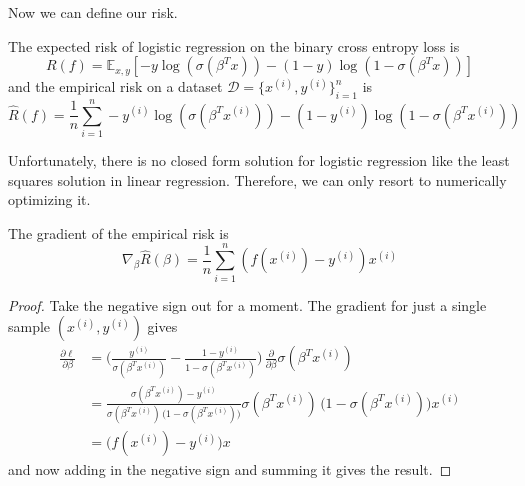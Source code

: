   Now we can define our risk. 

  \begin{theorem}[Risk]
    The expected risk of logistic regression on the binary cross entropy loss is 
    \begin{equation}
      R(f) = \mathbb{E}_{x, y} \left[ -y \log(\sigma(\beta^T x)) - (1 - y) \log(1 - \sigma(\beta^T x)) \right]
    \end{equation} 
    and the empirical risk on a dataset $\mathcal{D} = \{x^{(i)}, y^{(i)}\}_{i=1}^n$ is 
    \begin{equation}
      \hat{R}(f) = \frac{1}{n} \sum_{i=1}^n -y^{(i)} \log(\sigma(\beta^T x^{(i)})) - (1 - y^{(i)}) \log(1 - \sigma(\beta^T x^{(i)}))
    \end{equation}
  \end{theorem}

  Unfortunately, there is no closed form solution for logistic regression like the least squares solution in linear regression. Therefore, we can only resort to numerically optimizing it. 

  \begin{theorem}
    The gradient of the empirical risk is 
    \begin{equation}
      \nabla_\beta \hat{R}(\beta) = \frac{1}{n} \sum_{i=1}^n \left( f(x^{(i)}) - y^{(i)} \right) x^{(i)}
    \end{equation}
  \end{theorem}
  \begin{proof}
    Take the negative sign out for a moment. The gradient for just a single sample $(x^{(i)}, y^{(i)})$ gives 
    \begin{align}
      \frac{\partial \ell}{\partial \beta}  & = \bigg( \frac{y^{(i)}}{\sigma(\beta^T x^{(i)})} - \frac{1 - y^{(i)}}{1 - \sigma(\beta^T x^{(i)})} \bigg) \, \frac{\partial}{\partial \beta} \sigma (\beta^T x^{(i)}) \\
      & = \frac{\sigma(\beta^T x^{(i)}) - y^{(i)}}{\sigma(\beta^T x^{(i)}) \, \big( 1 - \sigma(\beta^T x^{(i)}) \big)} \sigma(\beta^T x^{(i)}) \, \big( 1 - \sigma(\beta^T x^{(i)}) \big) x^{(i)} \\
      & = \big( f (x^{(i)}) - y^{(i)} \big) x
    \end{align} 
    and now adding in the negative sign and summing it gives the result. 
  \end{proof} 

